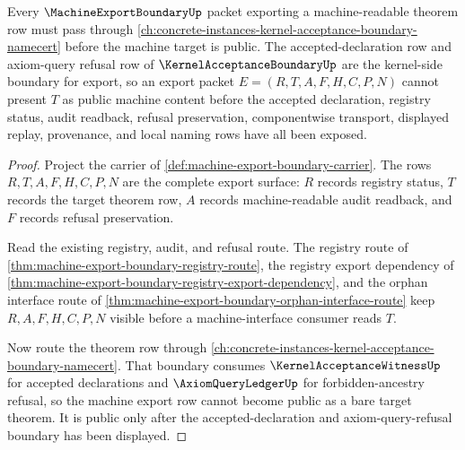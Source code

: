 \begin{theorem}
\label{thm:machine-export-boundary-kernel-acceptance-handoff}
Every $\MachineExportBoundaryUp$ packet exporting a machine-readable theorem row must pass through \autoref{ch:concrete-instances-kernel-acceptance-boundary-namecert} before the machine target is public. The accepted-declaration row and axiom-query refusal row of $\KernelAcceptanceBoundaryUp$ are the kernel-side boundary for export, so an export packet $E=(R,T,A,F,H,C,P,N)$ cannot present $T$ as public machine content before the accepted declaration, registry status, audit readback, refusal preservation, componentwise transport, displayed replay, provenance, and local naming rows have all been exposed.
\end{theorem}
\begin{proof}
Project the carrier of \autoref{def:machine-export-boundary-carrier}. The rows $R,T,A,F,H,C,P,N$ are the complete export surface: $R$ records registry status, $T$ records the target theorem row, $A$ records machine-readable audit readback, and $F$ records refusal preservation.

Read the existing registry, audit, and refusal route. The registry route of \autoref{thm:machine-export-boundary-registry-route}, the registry export dependency of \autoref{thm:machine-export-boundary-registry-export-dependency}, and the orphan interface route of \autoref{thm:machine-export-boundary-orphan-interface-route} keep $R,A,F,H,C,P,N$ visible before a machine-interface consumer reads $T$.

Now route the theorem row through \autoref{ch:concrete-instances-kernel-acceptance-boundary-namecert}. That boundary consumes $\KernelAcceptanceWitnessUp$ for accepted declarations and $\AxiomQueryLedgerUp$ for forbidden-ancestry refusal, so the machine export row cannot become public as a bare target theorem. It is public only after the accepted-declaration and axiom-query-refusal boundary has been displayed.
\end{proof}

